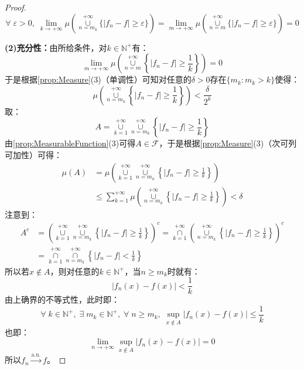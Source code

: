 \begin{proof}
	\begin{equation*}
		\forall\;\varepsilon>0,\;\lim_{k\to+\infty}\mu\left(\underset{n=m_k}{\overset{+\infty}{\cup}}\{|f_n-f|\geqslant\varepsilon\}\right)=\lim_{m\to+\infty}\mu\left(\underset{n=m}{\overset{+\infty}{\cup}}\{|f_n-f|\geqslant\varepsilon\}\right)=0
	\end{equation*}\par
	\textbf{(2)充分性：}由所给条件，对$k\in\mathbb{N}^+$有：
	\begin{equation*}
		\lim_{m\to+\infty}\mu\left(\underset{n=m}{\overset{+\infty}{\cup}}\left\{|f_n-f|\geqslant\frac{1}{k}\right\}\right)=0	
	\end{equation*}
	于是根据\cref{prop:Measure}(3)（单调性）可知对任意的$\delta>0$存在$\{m_k:m_k>k\}$使得：
	\begin{equation*}
		\mu\left(\underset{n=m_k}{\overset{+\infty}{\cup}}\left\{|f_n-f|\geqslant\frac{1}{k}\right\}\right)<\frac{\delta}{2^k}
	\end{equation*}
	取：
	\begin{equation*}
		A=\underset{k=1}{\overset{+\infty}{\cup}}\underset{n=m_k}{\overset{+\infty}{\cup}}\left\{|f_n-f|\geqslant\frac{1}{k}\right\}
	\end{equation*}
	由\cref{prop:MeasurableFunction}(3)可得$A\in\mathscr{F}$，于是根据\cref{prop:Measure}(3)（次可列可加性）可得：
	\begin{align*}
		\mu(A)&=\mu\left(\underset{k=1}{\overset{+\infty}{\cup}}\underset{n=m_k}{\overset{+\infty}{\cup}}\left\{|f_n-f|\geqslant\frac{1}{k}\right\}\right) \\
		&\leqslant\sum_{k=1}^{+\infty}\mu\left(\underset{n=m_k}{\overset{+\infty}{\cup}}\left\{|f_n-f|\geqslant\frac{1}{k}\right\}\right)<\delta
	\end{align*}
	注意到：
	\begin{align*}
		A^c&=\left(\underset{k=1}{\overset{+\infty}{\cup}}\underset{n=m_k}{\overset{+\infty}{\cup}}\left\{|f_n-f|\geqslant\frac{1}{k}\right\}\right)^c=\underset{k=1}{\overset{+\infty}{\cap}}\left(\underset{n=m_k}{\overset{+\infty}{\cup}}\left\{|f_n-f|\geqslant\frac{1}{k}\right\}\right)^c \\
		&=\underset{k=1}{\overset{+\infty}{\cap}}\underset{n=m_k}{\overset{+\infty}{\cap}}\left\{|f_n-f|<\frac{1}{k}\right\}
	\end{align*}
	所以若$x\notin A$，则对任意的$k\in \mathbb{N}^+$，当$n\geqslant m_k$时就有：
	\begin{equation*}
		|f_n(x)-f(x)|<\frac{1}{k}
	\end{equation*}
	由上确界的不等式性，此时即：
	\begin{equation*}
		\forall\;k\in\mathbb{N}^+,\;\exists\;m_k\in\mathbb{N}^+,\;\forall\;n\geqslant m_k,\;\sup_{x\notin A}|f_n(x)-f(x)|\leqslant\frac{1}{k}
	\end{equation*}
	也即：
	\begin{equation*}
		\lim_{n\to+\infty}\sup_{x\notin A}|f_n(x)-f(x)|=0
	\end{equation*}
	所以$f_n\overset{\text{a.u.}}{\longrightarrow}f$。
\end{proof}
